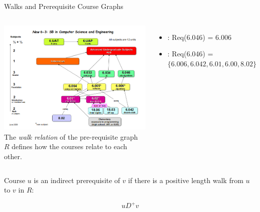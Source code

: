 \begin{frame}{Walks and Prerequisite Course Graphs}
  \begin{columns}
      \includegraphics[width=1\textwidth]{../img/MIT_prereq}
      The \emph{walk relation} of the pre-requisite graph $R$ defines how the courses relate to each other.
      \begin{itemize}
      \item {}: Req(6.046) = 6.006
      \item {}: Req(6.046) = $\{6.006, 6.042, 6.01, 6.00, 8.02\}$
      \end{itemize}\medskip
  \end{columns}\bigskip

  Course $u$ is an indirect prerequisite of $v$ if there is a positive length walk from $u$ to $v$ in $R$:\medskip

  \begin{equation*}
    u D^+ v
  \end{equation*}
\end{frame}

